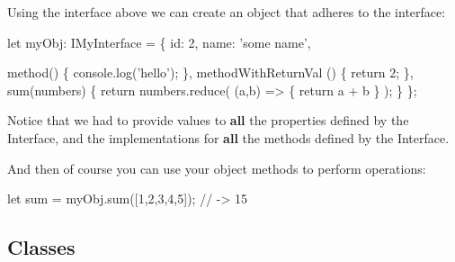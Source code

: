 \documentclass[12pt,]{article}
\newenvironment{Shaded}{}{}
\newcommand{\KeywordTok}[1]{\textcolor[rgb]{0.00,0.00,1.00}{{#1}}}
\newcommand{\DecValTok}[1]{{#1}}
\newcommand{\CommentTok}[1]{\textcolor[rgb]{0.00,0.50,0.00}{{#1}}}
\newcommand{\FunctionTok}[1]{{#1}}
\newcommand{\NormalTok}[1]{{#1}}
\begin{document}
Using the interface above we can create an object that adheres to the
interface:

\begin{Shaded}
\begin{Highlighting}[numbers=left,,]
\NormalTok{let myObj: IMyInterface = \{}
  \NormalTok{id: }\DecValTok{2}\NormalTok{,}
  \NormalTok{name: 'some name',}

  \FunctionTok{method}\NormalTok{() \{ console.}\FunctionTok{log}\NormalTok{('hello'); \},}
  \FunctionTok{methodWithReturnVal} \NormalTok{() \{ }\KeywordTok{return} \DecValTok{2}\NormalTok{; \},}
  \FunctionTok{sum}\NormalTok{(numbers) \{}
    \KeywordTok{return} \NormalTok{numbers.}\FunctionTok{reduce}\NormalTok{( (a,b) => \{ }\KeywordTok{return} \NormalTok{a + b \} );}
  \NormalTok{\}}
\NormalTok{\};}
\end{Highlighting}
\end{Shaded}

Notice that we had to provide values to \textbf{all} the properties
defined by the Interface, and the implementations for \textbf{all} the
methods defined by the Interface.

And then of course you can use your object methods to perform
operations:

\begin{Shaded}
\begin{Highlighting}[numbers=left,,]
\NormalTok{let sum = myObj.}\FunctionTok{sum}\NormalTok{([}\DecValTok{1}\NormalTok{,}\DecValTok{2}\NormalTok{,}\DecValTok{3}\NormalTok{,}\DecValTok{4}\NormalTok{,}\DecValTok{5}\NormalTok{]); }\CommentTok{// -> 15}
\end{Highlighting}
\end{Shaded}

\subsection{Classes}\label{classes}
\end{document}
